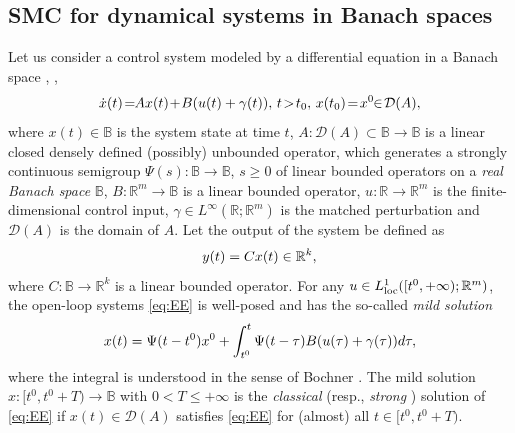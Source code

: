 \documentclass{article}
\newcommand{\R}{\mathbb{R}}
\newcommand{\B}{\mathbb{B}}
\newcommand{\D}{\mathcal{D}}
\begin{document}
 \subsection{SMC for dynamical systems in Banach spaces}
 {Let us consider a control system modeled by a differential equation in a Banach space \cite{DaleckyKrein1974:Book}, \cite{Yosida1980:Book}, \cite{Pazy1983:Book}\vspace{-1mm}
 	\begin{equation}\label{eq:EE}
 		\dot x(t)\!=\!\!Ax(t)\!+\!B(u(t)+\gamma(t)), \,t\!>\!t_0, \, x(t_0)\!=\!x^0\!\!\in\! \mathcal{D}(A), \vspace{-1mm}
 	\end{equation}
 	where $x(t)\in \B$ is the system state at time $t$, $A: \mathcal{D}(A)\subset \B\to \B$ is a linear closed densely defined (possibly) unbounded operator, which generates a strongly continuous semigroup $\Psi(s):\B\to \B$, $s\geq 0$ of linear bounded operators  on a \textit{real Banach space} $\B$, $B:\R^m\to \B$ is a linear bounded operator, $u:\R\to \R^m$ is the finite-dimensional control input, $\gamma\in L^{\infty}(\R;\R^m)$ is the matched perturbation   and $\mathcal{D}(A)$ is the domain of $A$. 
 	Let the output of the system be defined as \vspace{-1mm}
 	\begin{equation}\label{eq:EE_output}
 		y(t)=Cx(t)\in \R^k,\vspace{-1mm}
 	\end{equation}
 	where $C: \B\to \R^k$ is a linear bounded operator. 
 	For any $u\in L^1_{\rm loc}([t^0,+\infty);\R^m)$, the open-loop systems \eqref{eq:EE} is well-posed and has the so-called \textit{mild solution} 
 	\cite[page 106]{Pazy1983:Book}\vspace{-1mm}
 	\begin{equation}\label{eq:EE_solution}
 		x(t)=\Psi(t-t^0)x^0+\int^t_{t^0}\Psi(t-\tau)B(u(\tau)+\gamma(\tau)) d\tau,\vspace{-1mm}
 	\end{equation}
 	where the integral is understood in the sense of Bochner \cite{Yosida1980:Book}.
 	The mild solution $x: [t^0,t^0+T)\to \B$ with $0<T\leq +\infty$ is the  \textit{classical} (resp., \textit{strong}  \cite[page 109]{Pazy1983:Book}) solution of \eqref{eq:EE}  if $x(t)\!\in\! \D(A)$ satisfies \eqref{eq:EE} for (almost) all $t\in [t^0,t^0+T)$.
 	
}
\end{document}

